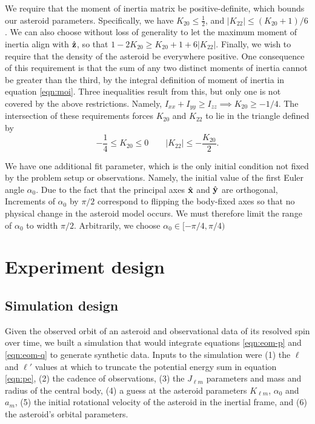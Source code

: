 \documentclass[11pt]{article}
\begin{document}
We require that the moment of inertia matrix be positive-definite, which bounds our asteroid parameters. Specifically, we have $K_{20} \leq \frac{1}{2}$, and $|K_{22}| \leq (K_{20}+1)/6$. We can also choose without loss of generality to let the maximum moment of inertia align with $\hat{\mathbf{z}}$, so that $1-2K_{20}\geq K_{20}+1+6|K_{22}|.$ Finally, we wish to require that the density of the asteroid be everywhere positive. One consequence of this requirement is that the sum of any two distinct moments of inertia cannot be greater than the third, by the integral definition of moment of inertia in equation \ref{eqn:moi}. Three inequalities result from this, but only one is not covered by the above restrictions. Namely, $I_{xx} + I_{yy}\geq I_{zz} \implies K_{20} \geq -1/4$. The intersection of these requirements forces $K_{20}$ and $K_{22}$ to lie in the triangle defined by
\begin{equation}
-\frac{1}{4} \leq K_{20} \leq 0 \qquad |K_{22}| \leq -\frac{K_{20}}{2}.
\label{eqn:parameter-bounds}
\end{equation}

We have one additional fit parameter, which is the only initial condition not fixed by the problem setup or observations. Namely, the initial value of the first Euler angle $\alpha_0$. Due to the fact that the principal axes $\hat{\mathbf{x}}$ and $\hat{\mathbf{y}}$ are orthogonal, Increments of $\alpha_0$ by $\pi/2$ correspond to flipping the body-fixed axes so that no physical change in the asteroid model occurs. We must therefore limit the range of $\alpha_0$ to width $\pi/2$. Arbitrarily, we choose $\alpha_0 \in [-\pi/4, \pi/4)$


\section{Experiment design}
\subsection{Simulation design}
\label{sec:simulation}
Given the observed orbit of an asteroid and observational data of its resolved spin over time, we built a simulation that would integrate equations \ref{eqn:eom-p} and \ref{eqn:eom-q} to generate synthetic data. Inputs to the simulation were (1) the $\ell$ and $\ell'$ values at which to truncate the potential energy sum in equation \ref{eqn:pe}, (2) the cadence of observations, (3) the $J_{\ell m}$ parameters and mass and radius of the central body, (4) a guess at the asteroid parameters $K_{\ell m}$, $\alpha_0$ and $a_m$, (5) the initial rotational velocity of the asteroid in the inertial frame, and (6) the asteroid's orbital parameters.
\end{document}
